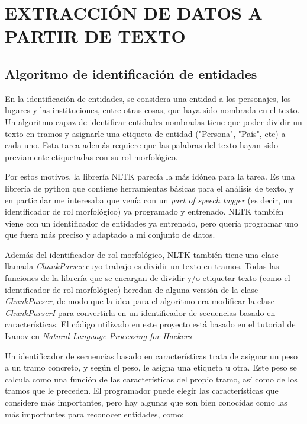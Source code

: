 \documentclass{pre-tfg}
\begin{document}
\section {EXTRACCIÓN DE DATOS A PARTIR DE TEXTO}

\subsection{Algoritmo de identificación de entidades}

En la identificación de entidades, se considera una entidad a los personajes, los lugares y las instituciones, entre otras cosas, que haya sido nombrada en el texto. Un algoritmo capaz de identificar entidades nombradas tiene que poder dividir un texto en tramos y asignarle una etiqueta de entidad ("Persona", "País", etc) a cada uno. Esta tarea además requiere que las palabras del texto hayan sido previamente etiquetadas con su rol morfológico.

Por estos motivos, la librería NLTK parecía la más idónea para la tarea. Es una librería de python que contiene herramientas básicas para el análisis de texto, y en particular me interesaba que venía con un \textit{part of speech tagger} (es decir, un identificador de rol morfológico) ya programado y entrenado. NLTK también viene con un identificador de entidades ya entrenado, pero quería programar uno que fuera más preciso y adaptado a mi conjunto de datos.

Además del identificador de rol morfológico, NLTK también tiene una clase llamada \textit{ChunkParser} cuyo trabajo es dividir un texto en tramos. Todas las funciones de la librería que se encargan de dividir y/o etiquetar texto (como el identificador de rol morfológico) heredan de alguna versión de la clase \textit{ChunkParser}, de modo que la idea para el algoritmo era modificar la clase \textit{ChunkParserI} para convertirla en un identificador de secuencias basado en características. El código utilizado en este proyecto está basado en el tutorial de Ivanov en \textit{Natural Language Processing for Hackers} \cite{ivanov_2016}

Un identificador de secuencias basado en características trata de asignar un peso a un tramo concreto, y según el peso, le asigna una etiqueta u otra. Este peso se calcula como una función de las características del propio tramo, así como de los tramos que le preceden.
El programador puede elegir las características que considere más importantes, pero hay algunas que son bien conocidas como las más importantes para reconocer entidades, como:
\end{document}
